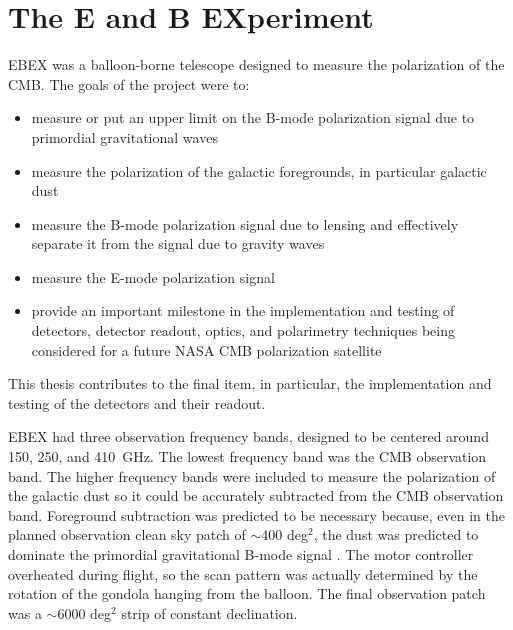 \section{The E and B EXperiment}
\label{sec:ebex}

\ac{EBEX} was a balloon-borne telescope designed to measure the polarization of the \ac{CMB}.
The goals of the project were to:
\begin{itemize}
\item measure or put an upper limit on the B-mode polarization signal due to primordial gravitational waves%
\item measure the polarization of the galactic foregrounds, in particular galactic dust
\item measure the B-mode polarization signal due to lensing and effectively separate it from the signal due to gravity waves
\item measure the E-mode polarization signal
\item provide an important milestone in the implementation and testing of detectors, detector readout, optics, and polarimetry techniques being considered for a future NASA CMB polarization satellite
\end{itemize}
This thesis contributes to the final item, in particular, the implementation and testing of the detectors and their readout. 

\ac{EBEX} had three observation frequency bands, designed to be centered around 150, 250, and 410~GHz. 
The lowest frequency band was the \ac{CMB} observation band. 
The higher frequency bands were included to measure the polarization of the galactic dust so it could be accurately subtracted from the \ac{CMB} observation band. 
Foreground subtraction was predicted to be necessary because, even in the planned observation clean sky patch of $\sim$400 deg$^2$, the dust was predicted to dominate the primordial gravitational B-mode signal \cite{Bao2015}. 
The motor controller overheated during flight, so the scan pattern was actually determined by the rotation of the gondola hanging from the balloon. 
The final observation patch was a $\sim$6000 deg$^2$ strip of constant declination.%

